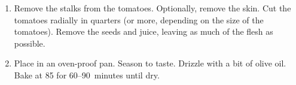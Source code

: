 
\begin{ingredients}
\end{ingredients}


\begin{recipe}
  \begin{enumerate}

  \item Remove the stalks from the tomatoes.  Optionally, remove the
    skin.  Cut the tomatoes radially in quarters (or more, depending
    on the size of the tomatoes).  Remove the seeds and juice, leaving
    as much of the flesh as possible.

  \item Place in an oven-proof pan.  Season to taste.  Drizzle with a
    bit of olive oil.  Bake at 85\degreeC{} for 60--90~minutes until dry.

  \end{enumerate}
\end{recipe}

